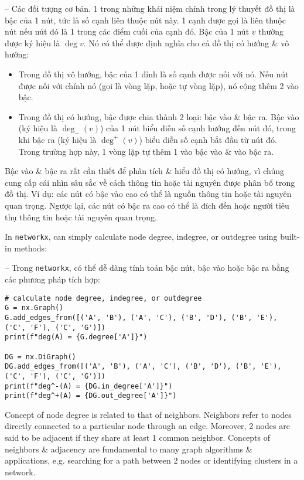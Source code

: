\documentclass{article}
\begin{document}
\begin{itemize}
\begin{itemize}
\begin{itemize}
            -- {\sf Các đối tượng cơ bản.} 1 trong những khái niệm chính trong lý thuyết đồ thị là bậc của 1 nút, tức là số cạnh liên thuộc nút này. 1 cạnh được gọi là liên thuộc nút nếu nút đó là 1 trong các điểm cuối của cạnh đó. Bậc của 1 nút $v$ thường được ký hiệu là $\deg v$. Nó có thể được định nghĩa cho cả đồ thị có hướng \& vô hướng:
            \begin{itemize}
                \item Trong đồ thị vô hướng, bậc của 1 đỉnh là số cạnh được nối với nó. Nếu nút được nối với chính nó (gọi là vòng lặp, hoặc tự vòng lặp), nó cộng thêm 2 vào bậc.
                \item Trong đồ thị có hướng, bậc được chia thành 2 loại: bậc vào \& bậc ra. Bậc vào (ký hiệu là $\deg_-(v)$) của 1 nút biểu diễn số cạnh hướng đến nút đó, trong khi bậc ra (ký hiệu là $\deg^+(v)$) biểu diễn số cạnh bắt đầu từ nút đó. Trong trường hợp này, 1 vòng lặp tự thêm 1 vào bậc vào \& vào bậc ra.
            \end{itemize}
            Bậc vào \& bậc ra rất cần thiết để phân tích \& hiểu đồ thị có hướng, vì chúng cung cấp cái nhìn sâu sắc về cách thông tin hoặc tài nguyên được phân bổ trong đồ thị. Ví dụ: các nút có bậc vào cao có thể là nguồn thông tin hoặc tài nguyên quan trọng. Ngược lại, các nút có bậc ra cao có thể là đích đến hoặc người tiêu thụ thông tin hoặc tài nguyên quan trọng.

            In {\tt networkx}, can simply calculate node degree, indegree, or outdegree using built-in methods:

            -- Trong {\tt networkx}, có thể dễ dàng tính toán bậc nút, bậc vào hoặc bậc ra bằng các phương pháp tích hợp:
            \begin{verbatim}
# calculate node degree, indegree, or outdegree
G = nx.Graph()
G.add_edges_from([('A', 'B'), ('A', 'C'), ('B', 'D'), ('B', 'E'), ('C', 'F'), ('C', 'G')])
print(f"deg(A) = {G.degree['A']}")

DG = nx.DiGraph()
DG.add_edges_from([('A', 'B'), ('A', 'C'), ('B', 'D'), ('B', 'E'), ('C', 'F'), ('C', 'G')])
print(f"deg^-(A) = {DG.in_degree['A']}")
print(f"deg^+(A) = {DG.out_degree['A']}")
            \end{verbatim}
            Concept of node degree is related to that of neighbors. Neighbors refer to nodes directly connected to a particular node through an edge. Moreover, 2 nodes are said to be adjacent if they share at least 1 common neighbor. Concepts of neighbors \& adjacency are fundamental to many graph algorithms \& applications, e.g. searching for a path between 2 nodes or identifying clusters in a network.


\end{itemize}
\end{itemize}
\end{itemize}
\end{document}
